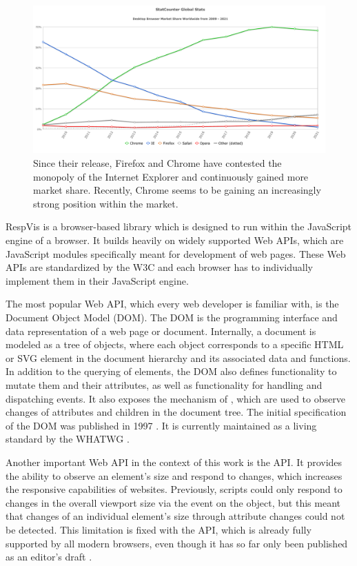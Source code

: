 \begin{figure}[tp]
\centering
\includegraphics[keepaspectratio,width=\linewidth,height=\fullh / 3]{diagrams/browser-market-share.pdf}
\caption[Desktop Browser Market Share]{
  Since their release, Firefox and Chrome have contested the monopoly of the Internet Explorer and continuously gained more market share. 
  Recently, Chrome seems to be gaining an increasingly strong position within the market. 
  }
\label{fig:BrowserMarketShare}
\end{figure}


RespVis is a browser-based library which is designed to run within the
JavaScript engine of a browser. It builds heavily on widely supported
Web APIs, which are JavaScript modules specifically meant for
development of web pages. These Web APIs are standardized by the W3C
and each browser has to individually implement them in their
JavaScript engine.

The most popular Web API, which every web developer is familiar with,
is the Document Object Model (DOM). The DOM is the programming
interface and data representation of a web page or document.
Internally, a document is modeled as a tree of objects, where each
object corresponds to a specific HTML or SVG element in the document
hierarchy and its associated data and functions. In addition to the
querying of elements, the DOM also defines functionality to mutate
them and their attributes, as well as functionality for handling and
dispatching events. It also exposes the mechanism of
, which are used to observe changes of
attributes and children in the document tree. The initial
specification of the DOM was published in 1997 \parencite{DOM1}. It
is currently maintained as a living standard by the WHATWG
\parencite{DOM}.

Another important Web API in the context of this work is the
 API. It provides the ability to observe an
element's size and respond to changes, which increases the responsive
capabilities of websites. Previously, scripts could only respond to
changes in the overall viewport size via the  event
on the  object, but this meant that changes of an
individual element's size through attribute changes could not be
detected. This limitation is fixed with the 
API, which is already fully supported by all modern browsers, even
though it has so far only been published as an editor's draft
\parencite{ResizeObserver}.






